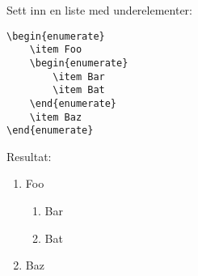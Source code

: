 \horizontalrule


\vspace{0.75em}
\noindent Sett inn en liste med underelementer:
\vspace{0.75em}
\begin{lstlisting}[language=Tex]
\begin{enumerate}
    \item Foo
    \begin{enumerate}
        \item Bar
        \item Bat
    \end{enumerate}
    \item Baz
\end{enumerate}
\end{lstlisting}
\vspace{0.75em}

\noindent Resultat:
\begin{enumerate}
    \item Foo
    \begin{enumerate}
        \item Bar
        \item Bat
    \end{enumerate}
    \item Baz
\end{enumerate}